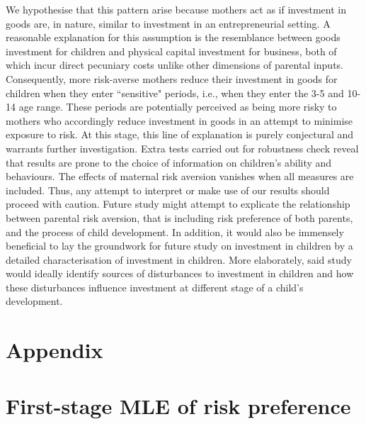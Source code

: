 \documentclass[emulatestandardclasses, 10pt, abstract = true]{scrartcl}
\begin{document}
We hypothesise that this pattern arise because mothers act as if investment in goods are, in nature, similar to investment in an entrepreneurial setting. A reasonable explanation for this assumption is the resemblance between goods investment for children and physical capital investment for business, both of which incur direct pecuniary costs unlike other dimensions of parental inputs. Consequently, more risk-averse mothers reduce their investment in goods for children when they enter ``sensitive" periods, i.e., when they enter the 3-5 and 10-14 age range. These periods are potentially perceived as being more risky to mothers who accordingly reduce investment in goods in an attempt to minimise exposure to risk. At this stage, this line of explanation is purely conjectural and warrants further investigation. Extra tests carried out for robustness check reveal that results are prone to the choice of information on children's ability and behaviours. The effects of maternal risk aversion vanishes when all measures are included. Thus, any attempt to interpret or make use of our results should proceed with caution. Future study might attempt to explicate the relationship between parental risk aversion, that is including risk preference of both parents, and the process of child development. In addition, it would also be immensely beneficial to lay the groundwork for future study on investment in children by a detailed characterisation of investment in children. More elaborately, said study would ideally identify sources of disturbances to investment in children and how these disturbances influence investment at different stage of a child's development.




\pagebreak





\pagebreak

\section*{Appendix}
\appendix

\setcounter{secnumdepth}{3}

\section{First-stage MLE of risk preference}
\end{document}
